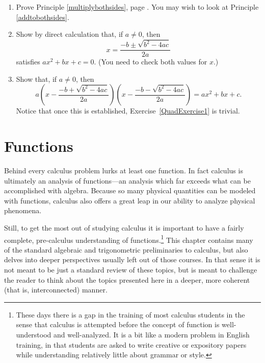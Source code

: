 \begin{enumerate}
\item  Prove Principle \ref{multiplybothsides},
page \pageref{multiplybothsides}.  You may wish to look at
Principle \ref{addtobothsides}. 



\item Show by direct calculation that, if $a\ne 0$, then
$$x=\frac{-b\pm\sqrt{b^2-4ac}}{2a}$$
satisfies $ax^2+bx+c=0$.  (You need to check both
values for $x$.)
\label{QuadExercise1}

\item Show that, if $a\ne 0$, then
$$a\left(x-\frac{-b+\sqrt{b^2-4ac}}{2a}
\right)\left(x-\frac{-b-\sqrt{b^2-4ac}}{2a}\right)
=ax^2+bx+c.$$
Notice that once this is established, Exercise~\ref{QuadExercise1}
is trivial.\label{QuadExercise2}

\end{enumerate}

\section{Functions}


Behind every calculus problem lurks at least one function.
In fact calculus is  ultimately an analysis of functions---an
analysis  which far exceeds  what can be accomplished with algebra.
Because so many physical quantities can be modeled with
functions, calculus also offers a great leap in
our ability to analyze physical phenomena.

Still, to get the most out of studying calculus it is important
to have a fairly complete, pre-calculus understanding of 
functions.\footnote{%
These days there is a gap in the training of most calculus students
in the sense that calculus is attempted before the concept of
function is well-understood and well-analyzed.  
It is a bit like
a modern problem in English training, in that students are asked to
write creative or expository papers while understanding relatively
little about grammar or style.
}
This chapter contains many of the standard algebraic and trigonometric
preliminaries to calculus, but also delves into deeper perspectives
usually left out of those courses. In that sense it is not meant
to be just a standard review of these topics, but is meant to
challenge the reader to think about the topics presented here
in a deeper, more coherent (that is, interconnected) manner.



